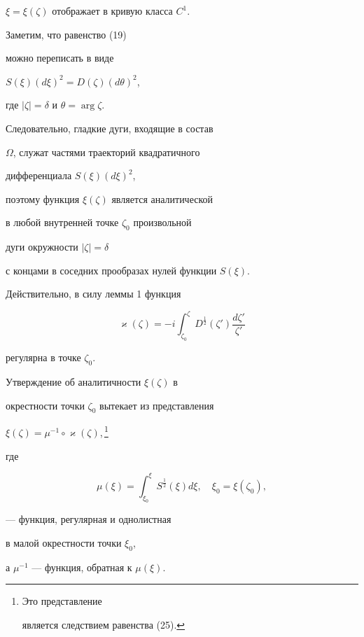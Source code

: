 \begin{pf}
$\xi=\xi(\zeta)$ отображает в кривую класса $C^{1}$. 


Заметим, что равенство (19) 


можно переписать в виде


$S(\xi)(d\xi)^{2}=D(\zeta)(d\theta)^{2}$,


где $|\zeta|=\delta$ и $\theta=\arg\zeta$. 


Следовательно, гладкие дуги, входящие в состав 


$\Omega$, служат частями траекторий квадратичного 


дифференциала $S(\xi)(d\xi)^{2}$,  


поэтому функция $\xi(\zeta)$ является аналитической 


в любой внутренней точке $\zeta_{0}$ произвольной 


дуги окружности $|\zeta|=\delta$ 


с концами в соседних прообразах нулей функции $S(\xi)$. 


Действительно, в силу леммы 1 функция


$$


\varkappa(\zeta)=


-i \int_{\zeta_{0}}^{\zeta}D^{\frac{1}{2}}(\zeta')


\frac{d\zeta'}{\zeta'}


$$


регулярна в точке $\zeta_{0}$.


Утверждение об аналитичности $\xi(\zeta)$ в 


окрестности точки $\zeta_{0}$ вытекает из  представления


$\xi(\zeta)=\mu^{-1}\circ\varkappa(\zeta)$,\,\footnote{Это представление 


является следствием равенства (25).}


где  


$$


\mu(\xi)=\int_{\xi_{0}}^{\xi}S^{\frac{1}{2}}(\xi)d\xi,\quad


\xi_{0}=\xi(\zeta_{0}),


$$


\setcounter{footnote}{0}





\noindent{}--- функция, регулярная и однолистная 


в малой окрестности точки $\xi_{0}$,


а $\mu^{-1}$ --- функция, обратная к $\mu(\xi)$.






\end{pf}
